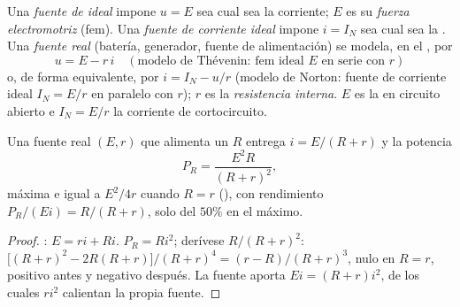 \begin{definition}\label{def:b1:dc-circuits:sources}
Una \emph{fuente de  ideal} impone $u = E$ sea cual sea la
corriente; $E$ es su \emph{fuerza electromotriz} (fem). Una \emph{fuente
de corriente ideal} impone $i = I_N$ sea cual sea la . Una
\emph{fuente real} (batería, generador, fuente de alimentación) se modela,
en el , por
\[
u = E - r\,i \quad (\text{modelo de Thévenin: fem ideal } E \text{ en serie con } r)
\]
o, de forma equivalente, por $i = I_N - u/r$ (modelo de Norton: fuente de
corriente ideal $I_N = E/r$ en paralelo con $r$); $r$ es la
\emph{resistencia interna}. $E$ es la  en circuito abierto e
$I_N = E/r$ la corriente de cortocircuito.
\end{definition}

\begin{proposition}\label{prop:b1:dc-circuits:sourcepower}
Una fuente real $(E, r)$ que alimenta un  $R$ entrega
$i = E/(R + r)$ y la potencia
\[
P_R = \frac{E^2 R}{(R + r)^2},
\]
máxima e igual a $E^2/4r$ cuando $R = r$ (\emph{}), con rendimiento $P_R/(Ei) = R/(R + r)$, solo del $50\%$ en el máximo.
\end{proposition}

\begin{proof}
: $E = ri + Ri$. $P_R = Ri^2$; derívese $R/(R + r)^2$:
$\big[(R + r)^2 - 2R(R + r)\big]/(R + r)^4 = (r - R)/(R + r)^3$, nulo en
$R = r$, positivo antes y negativo después. La fuente aporta
$Ei = (R + r)i^2$, de los cuales $ri^2$ calientan la propia fuente.
\end{proof}

